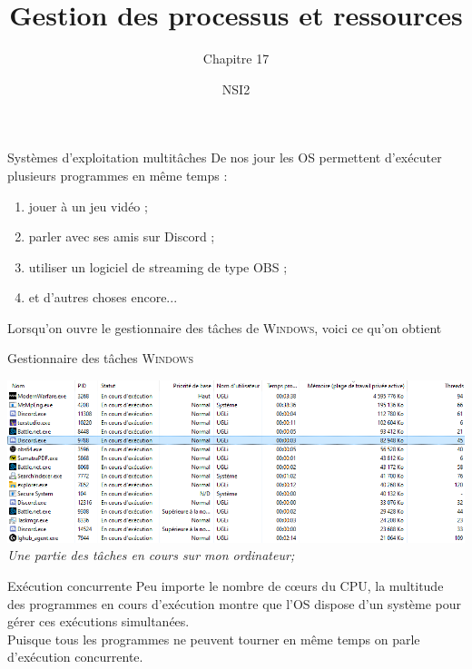\documentclass[10pt]{nsibeamer}
\title{Gestion des processus et ressources}
\subtitle{Chapitre 17}
\author{NSI2}
\begin{document}
\maketitle
{}
\begin{frame}{Systèmes d'exploitation multitâches}\pause
De nos jour les OS permettent d'exécuter plusieurs programmes en même temps :\\\pause

\begin{enumerate}[--]
	\item jouer à un jeu vidéo ;\pause
    \item parler avec ses amis sur Discord ;\pause
    \item utiliser un logiciel de streaming de type OBS ;\pause
    \item et d'autres choses encore...\pause
\end{enumerate}
Lorsqu'on ouvre le gestionnaire des tâches de \textsc{Windows}, voici ce qu'on obtient
\end{frame}
\begin{frame}{Gestionnaire des tâches \textsc{Windows}}
\begin{center}
\includegraphics[width=\linewidth]{img/gest}\\

\small \textit{Une partie des tâches en cours sur mon ordinateur;}
\end{center}
\end{frame}
\begin{frame}{Exécution concurrente}\pause
Peu importe le nombre de c\oe urs du CPU, la multitude des programmes en cours d'exécution montre que l'OS dispose d'un système pour gérer ces exécutions simultanées.\\\pause
Puisque tous les programmes ne peuvent \og tourner en même temps\fg{} on parle d'\alert{exécution concurrente}.
\end{frame}
\end{document}
